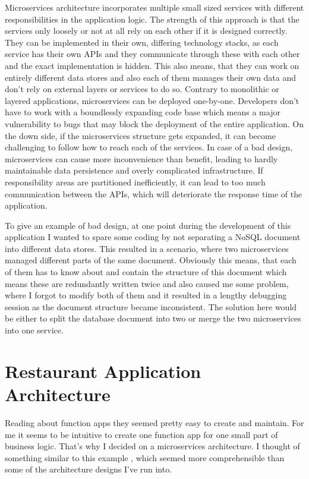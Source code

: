  Microservices architecture \cite{MicroservicesArch} incorporates multiple small sized services with different responsibilities in the application logic. The strength of this approach is that the services only loosely or not at all rely on each other if it is designed correctly. They can be implemented in their own, differing technology stacks, as each service has their own APIs and they communicate through these with each other and the exact implementation is hidden. This also means, that they can work on entirely different data stores and also each of them manages their own data and don't rely on external layers or services to do so. Contrary to monolithic or layered applications, microservices can be deployed one-by-one. Developers don't have to work with a boundlessly expanding code base which means a major vulnerability to bugs that may block the deployment of the entire application.
On the down side, if the microservices structure gets expanded, it can become challenging to follow how to reach each of the services. In case of a bad design, microservices can cause more inconvenience than benefit, leading to hardly maintainable data persistence and overly complicated infrastructure. If responsibility areas are partitioned inefficiently, it can lead to too much communication between the APIs, which will deteriorate the response time of the application.

To give an example of bad design, at one point during the development of this application I wanted to spare some coding by not separating a NoSQL document into different data stores. This resulted in a scenario, where two microservices managed different parts of the same document. Obviously this means, that each of them has to know about and contain the structure of this document which means these are redundantly written twice and also caused me some problem, where I forgot to modify both of them and it resulted in a lengthy debugging session as the document structure became inconsistent. The solution here would be either to split the database document into two or merge the two microservices into one service.

\section{Restaurant Application Architecture}

Reading about function apps they seemed pretty easy to create and maintain. For me it seems to be intuitive to create one function app for one small part of business logic. That's why I decided on a microservices architecture. I thought of something similar to this example \cite{FuncAppsCosmosDB}, which seemed more comprehensible than some of the architecture designs I've run into. 

